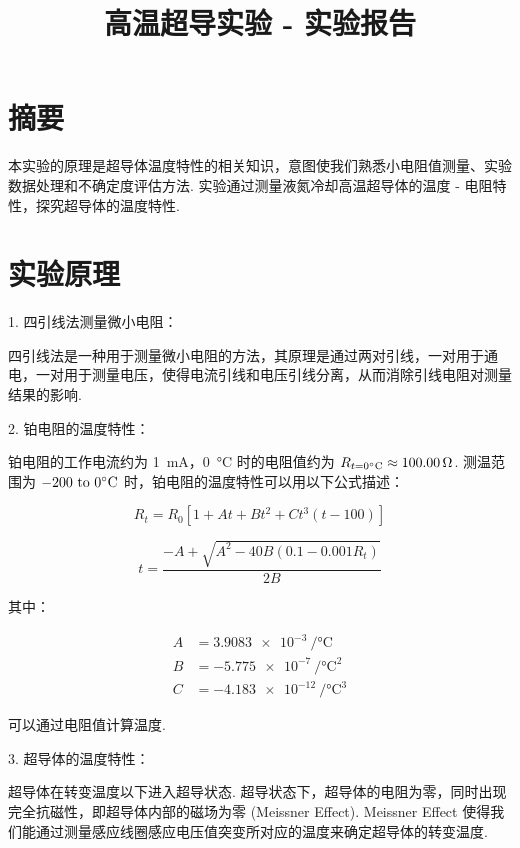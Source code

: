 \documentclass{THUexprep}
\begin{document}
\title{高温超导实验 - 实验报告}
\maketitle

\section{摘要}

本实验的原理是超导体温度特性的相关知识，意图使我们熟悉小电阻值测量、实验数据处理和不确定度评估方法. 实验通过测量液氮冷却高温超导体的温度 - 电阻特性，探究超导体的温度特性.

\section{实验原理}

1. 四引线法测量微小电阻：

四引线法是一种用于测量微小电阻的方法，其原理是通过两对引线，一对用于通电，一对用于测量电压，使得电流引线和电压引线分离，从而消除引线电阻对测量结果的影响.

2. 铂电阻的温度特性：

铂电阻的工作电流约为 \SI{1}{\milli\ampere}，\SI{0}{\celsius} 时的电阻值约为 $R_{t=0\celsius}\approx\SI{100.00}{\ohm}$. 测温范围为 $\numrange{-200}{0}\celsius$ 时，铂电阻的温度特性可以用以下公式描述：

\begin{equation}
    R_t = R_0 \left[1 + A t + B t^2 + C t^3(t-100)\right]
\end{equation}

\begin{equation}
    t=\frac{-A+\sqrt{A^2-40B(0.1-0.001R_t)}}{2B}
\end{equation}

其中：

\begin{equation}
    \begin{aligned}
        A &= \SI{3.9083e-3}{\per\celsius}\\
        B &= \SI{-5.775e-7}{\per\celsius\squared}\\
        C &= \SI{-4.183e-12}{\per\celsius\cubed}
    \end{aligned}
\end{equation}

可以通过电阻值计算温度.

3. 超导体的温度特性：

超导体在转变温度以下进入超导状态. 超导状态下，超导体的电阻为零，同时出现完全抗磁性，即超导体内部的磁场为零 (Meissner Effect). Meissner Effect 使得我们能通过测量感应线圈感应电压值突变所对应的温度来确定超导体的转变温度.
\end{document}
